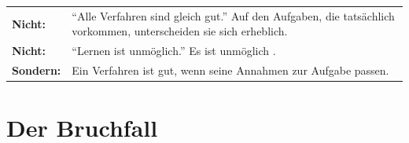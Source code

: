 \begin{warnung}
\begin{center}
{\small
\renewcommand{\arraystretch}{1.52}
\begin{tabular}{@{}P{2.4cm}P{6.2cm}@{}}
\toprule
\textbf{Nicht:} & \enquote{Alle Verfahren sind gleich gut.} Auf den Aufgaben, die tatsächlich vorkommen, unterscheiden sie sich erheblich.\\
\textbf{Nicht:} & \enquote{Lernen ist unmöglich.} Es ist unmöglich .\\
\textbf{Sondern:} & Ein Verfahren ist gut, wenn seine Annahmen zur Aufgabe passen.\\
\bottomrule
\end{tabular}}
\end{center}

\begin{center}
\begin{minipage}{0.88\textwidth}
\end{minipage}
\end{center}
\end{warnung}

\section{Der Bruchfall}

